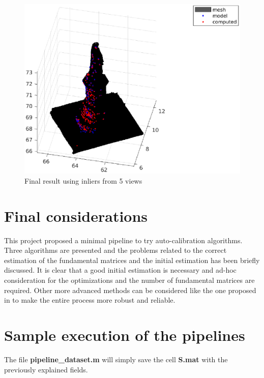 \documentclass[12pt]{article}
\begin{document}
\begin{figure}[H]
    \centering
    \includegraphics[scale=0.65]{images/statue.eps}
    \caption{Final result using inliers from 5 views}
    \label{fig:statue}
\end{figure}

\section{Final considerations}
This project proposed a minimal pipeline to try auto-calibration algorithms. Three algorithms are presented and the problems related to the correct estimation of the fundamental matrices and the initial estimation has been briefly discussed. It is clear that a good initial estimation is necessary and ad-hoc consideration for the optimizations and the number of fundamental matrices are required. Other more advanced methods can be considered like the one proposed in \cite{Gherardi10} to make the entire process more robust and reliable. 

\newpage
\section{Sample execution of the pipelines}
The file \textbf{pipeline\_dataset.m} will simply save the cell \textbf{S.mat} with the previously explained fields.
\end{document}

